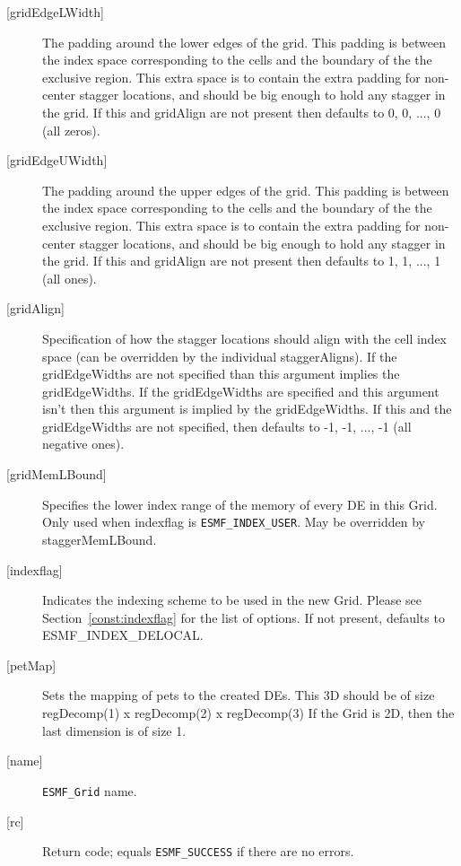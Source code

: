 \begin{description}
   \item[{[gridEdgeLWidth]}]
        The padding around the lower edges of the grid. This padding is between
        the index space corresponding to the cells and the boundary of the
        the exclusive region. This extra space is to contain the extra
        padding for non-center stagger locations, and should be big enough
        to hold any stagger in the grid. If this and gridAlign are not present then
        defaults to 0, 0, ..., 0 (all zeros).
   \item[{[gridEdgeUWidth]}]
        The padding around the upper edges of the grid. This padding is between
        the index space corresponding to the cells and the boundary of the
        the exclusive region. This extra space is to contain the extra
        padding for non-center stagger locations, and should be big enough
        to hold any stagger in the grid. If this and gridAlign are not present then
        defaults to 1, 1, ..., 1 (all ones).
   \item[{[gridAlign]}]
       Specification of how the stagger locations should align with the cell
       index space (can be overridden by the individual staggerAligns). If
       the gridEdgeWidths are not specified than this argument
       implies the gridEdgeWidths. If the gridEdgeWidths are specified and this argument isn't
       then this argument is implied by the gridEdgeWidths.
       If this and the gridEdgeWidths are not specified, then defaults to
      -1, -1, ..., -1 (all negative ones).
   \item[{[gridMemLBound]}]
        Specifies the lower index range of the memory of every DE in this Grid.
        Only used when indexflag is {\tt ESMF\_INDEX\_USER}. May be overridden
        by staggerMemLBound.
   \item[{[indexflag]}]
        Indicates the indexing scheme to be used in the new Grid. Please see
        Section~\ref{const:indexflag} for the list of options. If not present,
        defaults to ESMF\_INDEX\_DELOCAL.
   \item[{[petMap]}]
         Sets the mapping of pets to the created DEs. This 3D
         should be of size regDecomp(1) x regDecomp(2) x regDecomp(3)
         If the Grid is 2D, then the last dimension is of size 1.
   \item[{[name]}]
        {\tt ESMF\_Grid} name.
   \item[{[rc]}]
        Return code; equals {\tt ESMF\_SUCCESS} if there are no errors.
   \end{description}
   
